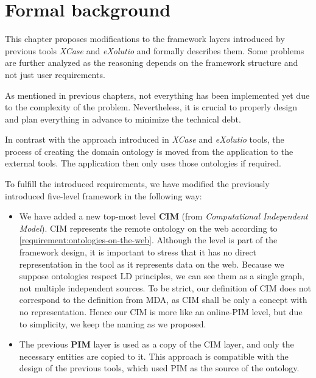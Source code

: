 \chapter{Formal background}
\label{chapters:formal-background}

This chapter proposes modifications to the framework layers introduced by previous tools \textit{XCase} and \textit{eXolutio} and formally describes them. Some problems are further analyzed as the reasoning depends on the framework structure and not just user requirements.

As mentioned in previous chapters, not everything has been implemented yet due to the complexity of the problem. Nevertheless, it is crucial to properly design and plan everything in advance to minimize the technical debt.

\bigskip

In contrast with the approach introduced in \textit{XCase} and \textit{eXolutio} tools, the process of creating the domain ontology is moved from the application to the external tools. The application then only uses those ontologies if required.

To fulfill the introduced requirements, we have modified the previously introduced five-level framework in the following way:
\begin{itemize}
    \item We have added a new top-most level \textbf{CIM} (from \textit{Computational Independent Model}). CIM represents the remote ontology on the web according to \autoref{requirement:ontologies-on-the-web}. Although the level is part of the framework design, it is important to stress that it has no direct representation in the tool as it represents data on the web. Because we suppose ontologies respect LD principles, we can see them as a single graph, not multiple independent sources. To be strict, our definition of CIM does not correspond to the definition from MDA, as CIM shall be only a concept with no representation. Hence our CIM is more like an online-PIM level, but due to simplicity, we keep the naming as we proposed.
    \item The previous \textbf{PIM} layer is used as a copy of the CIM layer, and only the necessary entities are copied to it. This approach is compatible with the design of the previous tools, which used PIM as the source of the ontology.
\end{itemize}

